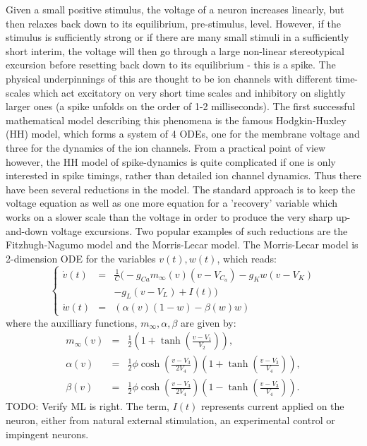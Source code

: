 Given a small positive stimulus, the voltage of a neuron increases linearly, but
then relaxes back down to its equilibrium, pre-stimulus, level. However, if the
stimulus is sufficiently strong or if there are many small stimuli in a
sufficiently short interim, the voltage will then go through a large
 non-linear stereotypical excursion before resetting back down to its equilibrium
 - this is a spike. The physical underpinnings of this are thought to be ion
 channels with different time-scales which act excitatory on very short time
 scales and inhibitory on slightly larger ones (a spike unfolds on the order of
 1-2 milliseconds). The first successful mathematical model describing this
 phenomena is the famous Hodgkin-Huxley (HH) model, which forms a system of 4
 ODEs, one for the membrane voltage and three for the dynamics of the ion
 channels. From a practical point of view however, the HH model of
 spike-dynamics is quite complicated if one is only interested in spike timings,
 rather than detailed ion channel dynamics. Thus there have been several
 reductions in the model. The standard approach is to keep the voltage equation
 as well as one more equation for a 'recovery' variable which works on a slower
 scale than the voltage in order to produce the very sharp up-and-down voltage
 excursions. Two popular examples of such reductions are the Fitzhugh-Nagumo
 model and the Morris-Lecar model. The Morris-Lecar model
 is 2-dimension ODE for the variables $v(t), w(t)$, which reads:
\begin{equation}
\left\{
\begin{array}{ccl}
\dot{v}(t)  &=& \frac{1}{C}\Big(-g_{Ca}m_\infty(v) (v-V_{C_a}) -
g_K w (v-V_K) \\ && 
-g_L(v-V_L)+I(t)  \Big) \\
\dot{w}(t)&=&\left(\alpha(v)(1-w) - \beta(w)w\right)
\end{array}
\right.
\label{eq:ML_original_deterministic}
\end{equation}
where the auxilliary functions, $m_\infty, \alpha, \beta$ are given by:
\begin{eqnarray*}
m_\infty(v)&=&\frac{1}{2}\left(1+\tanh\left(\frac{v-V_1}{V_2}\right)\right),\\
\alpha(v) &=& \frac{1}{2}\phi \cosh\left(\frac{v-V_3}{2V_4}\right)\left(1+\tanh\left(\frac{v-V_3}{V_4}\right)\right),\\
\beta(v) &=& \frac{1}{2}\phi \cosh\left(\frac{v-V_3}{2V_4}\right)\left(1-\tanh\left(\frac{v-V_3}{V_4}\right)\right).
\end{eqnarray*}
TODO: Verify ML is right. 
The term, $I(t)$ represents current applied on the neuron, either from natural
external stimulation, an experimental control or impingent neurons. 

